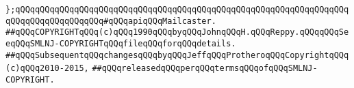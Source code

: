 \newline
\verb|};qQQqqQQqqQQqqQQqqQQqqQQqqQQqqQQqqQQqqQQqqQQqqQQqqQQqqQQqqQQqqQQqqQQqqQQqqQQqqQQqqQQqqQQq#qQQqapiqQQqMailcaster.|\newline
\newline
\newline
\verb|##qQQqCOPYRIGHTqQQq(c)qQQq1990qQQqbyqQQqJohnqQQqH.qQQqReppy.qQQqqQQqSeeqQQqSMLNJ-COPYRIGHTqQQqfileqQQqforqQQqdetails.|\newline
\verb|##qQQqSubsequentqQQqchangesqQQqbyqQQqJeffqQQqProtheroqQQqCopyrightqQQq(c)qQQq2010-2015,|\newline
\verb|##qQQqreleasedqQQqperqQQqtermsqQQqofqQQqSMLNJ-COPYRIGHT.|\newline

